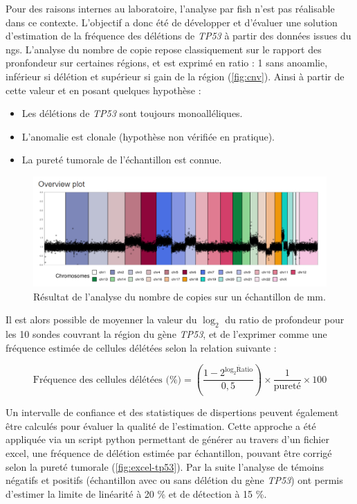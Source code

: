 Pour des raisons internes au laboratoire, l'analyse par \gls{fish} n'est pas réalisable dans ce contexte.  
L'objectif a donc été de développer et d'évaluer une solution d'estimation de la fréquence des délétions de \textit{TP53} à partir des données issues du \gls{ngs}. 
L'analyse du nombre de copie repose classiquement sur le rapport des pronfondeur sur certaines régions, et est exprimé en ratio : 1 sans anoamlie, inférieur si délétion 
et supérieur si gain de la région (\autoref{fig:cnv}). Ainsi à partir de cette valeur et en posant quelques hypothèse :

\begin{itemize}
    \item Les délétions de \textit{TP53} sont toujours monoalléliques.
    \item L'anomalie est clonale (hypothèse non vérifiée en pratique).
    \item La pureté tumorale de l'échantillon est connue.
\end{itemize}

\begin{figure}[H]
    \centering
    \includegraphics[width=1\textwidth]{images/cnv.png}
    \caption{Résultat de l'analyse du nombre de copies sur un échantillon de \gls{mm}.}
    \label{fig:cnv}
\end{figure}

Il est alors possible de moyenner la valeur du $\log_2$ du ratio de profondeur pour les 10 sondes couvrant la région du gène \textit{TP53},  
et de l'exprimer comme une fréquence estimée de cellules délétées selon la relation suivante :

\begin{equation}
    \text{Fréquence des cellules délétées (\%)} = \left( \frac{1 -2^{\overline{\log_2\text{Ratio}}}}{0{,}5} \right) 
    \times \frac{1}{\text{pureté}} \times 100
\end{equation}
    
Un intervalle de confiance et des statistiques de dispertions peuvent également être calculés pour évaluer la qualité de l'estimation. Cette 
approche a été appliquée via un script python permettant de générer au travers d'un fichier excel, une fréquence de délétion estimée par échantillon,
pouvant être corrigé selon la pureté tumorale (\autoref{fig:excel-tp53}). Par la suite l'analyse de témoins négatifs et positifs 
(échantillon avec ou sans délétion du gène \textit{TP53}) ont permis d'estimer la limite de linéarité à 20 \% et de détection à 15 \%.


